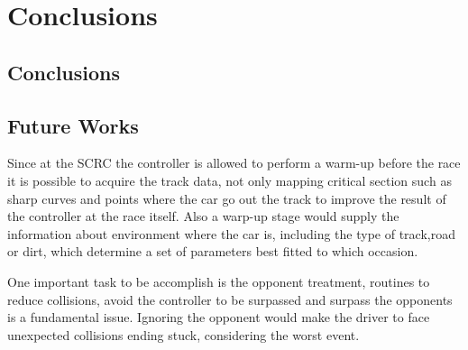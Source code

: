 \section{Conclusions} \label{sec:Conclusions}

	
\subsection{Conclusions} \label{subsec:Conclusions}


\subsection{Future Works} \label{subsec:Future}
	
	Since at the SCRC the controller is allowed to perform a warm-up before the race it is possible to acquire the track data, not only mapping critical section such as sharp curves and points where the car go out the track to improve the result of the controller at the race itself. Also a warp-up stage would supply the information about environment where the car is, including the type of track,road or dirt, which determine a set of parameters best fitted to which occasion. 
		
	One important task to be accomplish is the opponent treatment, routines to reduce collisions, avoid the controller to be surpassed and surpass the opponents is a fundamental issue. Ignoring the opponent would make the driver to face unexpected collisions ending stuck, considering the worst event.
	
	
	
	
